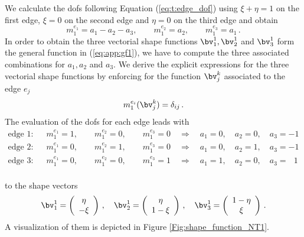 We calculate the dofs  following Equation (\ref{eq:t:edge_dof}) using $\xi + \eta = 1$ on the first edge, $\xi=0$ on the second edge and $\eta=0$ on the third edge and obtain
\begin{equation}
 m^{e_1}_{1} = a_1- a_2 - a_3, \qquad m^{e_2}_{1} = a_2, \qquad  m^{e_3}_{1} = a_1\,.
\end{equation}
In order to obtain the three vectorial shape functions $ \bv^1_1,  \bv^1_2$ and $ \bv^1_3$ form the general function in  (\ref{eq:app:gf1}), we have to compute the three associated combinations for $a_1, a_2$ and $a_3$. We derive the explicit expressions for the three vectorial shape functions by enforcing for the function $\bv_j^k$ associated to the edge $e_j$ 
\begin{equation}
 m^{e_i}_{1} (\bv_j^k) = \delta_{ij}\,.
\end{equation}
 The evaluation of the dofs for each edge leads with
\begin{equation}
\begin{aligned}
\textrm{edge 1:} \quad &m^{e_1}_{1} = 1, \qquad m^{e_2}_{1} = 0, \qquad  m^{e_3}_{1} = 0 \quad \Rightarrow \quad a_1=0, \quad a_2=0, \quad a_3=-1 \\ 
\textrm{edge 2:}  \quad  &m^{e_1}_{1} = 0, \qquad m^{e_2}_{1} = 1, \qquad  m^{e_3}_{1} = 0 \quad \Rightarrow \quad a_1=0, \quad a_2=1, \quad a_3=-1 \\ 
\textrm{edge 3:} \quad   &m^{e_1}_{1} = 0, \qquad m^{e_2}_{1} = 0, \qquad  m^{e_3}_{1} = 1 \quad \Rightarrow \quad a_1=1, \quad a_2=0, \quad a_3=\,\,\,\,1 \\ 
 \end{aligned}
\end{equation}


to the shape vectors 
\begin{equation}
\bv^1_1 =  \left( \begin{array}{c}
\eta \\ 
- \xi
\end{array} \right) \,, \quad
 \bv^1_2 =  \left( \begin{array}{c}
\eta \\
 1 - \xi
\end{array} \right)\,, \quad
\bv^1_3 =  \left( \begin{array}{c}
1 - \eta \\ 
\xi
\end{array} \right) \,.
\end{equation}
A visualization of them is depicted in Figure \ref{Fig:shape_function_NT1}.

